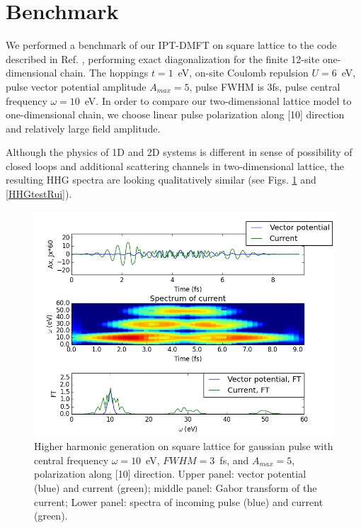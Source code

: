 \documentclass[prb,aps,twocolumn,showpacs,amsmath,amssymb]{revtex4}%
\begin{document}
\section{\label{Benchmark}Benchmark}

We performed a benchmark of our IPT-DMFT on square lattice to the code described in Ref. \cite{Rui}, performing exact diagonalization for the finite 12-site one-dimensional chain.
The hoppings $t=1$~eV, on-site Coulomb repulsion $U=6$~eV, pulse vector potential amplitude $A_{max}=5$, pulse FWHM is 3fs, pulse central frequency $\omega=10$~eV. In order to compare our two-dimensional lattice model to one-dimensional chain, we choose linear pulse polarization along [10] direction and relatively large field amplitude.

Although the physics of 1D and 2D systems is different in sense of 
possibility of closed loops and additional scattering channels in two-dimensional lattice, the resulting HHG spectra are looking qualitatively similar (see Figs. \ref{HHGtestVitja} and \ref{HHGtestRui}).  
 
\begin{figure}[h!]
 \includegraphics[width=1.0\linewidth,angle=0]{HHGtestVitja.png}
\caption{Higher harmonic generation on square lattice for gaussian pulse with central frequency $\omega=10$~eV, $FWHM=3$~fs, and $A_{max}=5$, polarization along [10] direction. Upper panel: vector potential (blue) and current (green); middle panel: Gabor transform of the current; Lower panel: spectra of incoming pulse (blue) and current (green).}
\label{HHGtestVitja}  
\end{figure}
\end{document}
